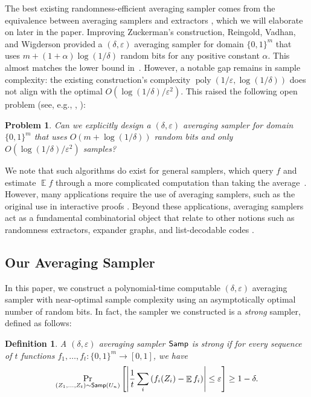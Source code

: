 \documentclass[11pt,letterpaper]{article}
\newtheorem{problem}{Problem}
\newtheorem{definition}[theorem]{Definition}
\DeclareMathOperator*{\E}{\mathbb{E}}
\DeclareMathOperator*{\poly}{poly}
\newcommand{\eps}{\varepsilon}
\newcommand{\1}{\mathbbm{1}}
\newcommand{\abs}[1]{\left|#1\right| }
\newcommand{\tuple}[1]{\left(#1\right)}
\newcommand{\zo}{\{0, 1\}}
\newcommand{\Smp}{\textup{\textsf{Samp}}}
\begin{document}
The best existing randomness-efficient averaging sampler comes from the equivalence between averaging samplers and extractors \cite{zuckerman1997randomness}, which we will elaborate on later in the paper. Improving Zuckerman's construction, Reingold, Vadhan, and Wigderson \cite{reingold2000entropy} provided a $(\delta, \eps)$ averaging sampler for domain $\zo^{m}$ that uses $m + (1 + \alpha)\log (1 / \delta)$ random bits for any positive constant $\alpha$. This almost matches the lower bound in~\cite{CEG95}. However, a notable gap remains in sample complexity: the existing construction's complexity $\poly(1 / \eps, \log (1 / \delta))$ does not align with the optimal $O( \log (1 / \delta)  / \eps^2)$. This raised the following open problem (see, e.g., \cite[Open Problem 4.24]{vadhan2012pseudorandomness}, \cite[Section 6]{oded_survey}):
\begin{problem}
  \label{problem1}
  {Can we explicitly design a $(\delta, \eps)$ averaging sampler for domain $\zo^m$ that uses $O(m + \log (1 / \delta))$ random bits and only $O( \log (1 / \delta)  / \eps^2)$ samples?}
\end{problem}


We note that such algorithms do exist for general samplers, which query $f$ and estimate $\E f$ through a more complicated  computation than taking the average~\cite{BGG93}.  
However, many applications require the use of averaging samplers, such as the original use in interactive proofs \cite{bellare1994randomness}. 
Beyond these applications, averaging samplers act as a fundamental combinatorial object that relate to other notions such as randomness extractors, expander graphs, and list-decodable codes \cite{zuckerman1997randomness, vadhan2007unified}.

\subsection{Our Averaging Sampler} 
In this paper, we construct a polynomial-time computable $(\delta, \eps)$ averaging sampler with near-optimal sample complexity using an asymptotically optimal number of random bits.  In fact, the sampler we constructed is a \emph{strong} sampler, defined as follows:

\begin{definition}
    A $(\delta, \varepsilon)$ averaging sampler $\Smp$ is \emph{strong} if
    for every sequence of $t$ functions $f_1, \dots, f_t: \zo^m \to [0,1]$, we have
    \[
    \Pr_{(Z_1, \dots, Z_t) \sim \Smp(U_n)}
    \left[ \abs{\frac{1}{t}  \sum_i \tuple{f_i(Z_i) - \E f_i}} \leq \varepsilon \right]
    \geq 1 - \delta.
    \]
\end{definition}
\end{document}
